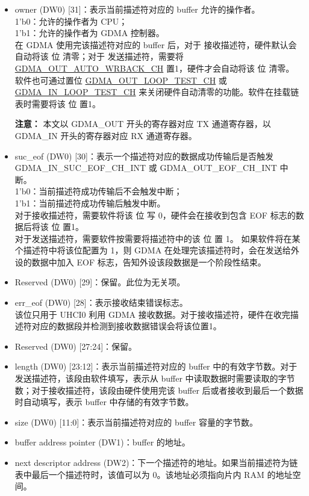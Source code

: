 \documentclass[main\_\_CN.tex]{subfiles}
\begin{document}
\begin{itemize}
    \item owner (DW0) [31]：表示当前描述符对应的 buffer 允许的操作者。\\
    1'b0：允许的操作者为 CPU；\\
    1'b1：允许的操作者为 GDMA 控制器。\\
    在 GDMA 使用完该描述符对应的 buffer 后，对于 接收描述符，硬件默认会自动将该 位 清零；对于 发送描述符，需要将 \hyperref[fielddesc:GDMAOUTAUTOWRBACKCHN]{GDMA\_OUT\_AUTO\_WRBACK\_CH} 置1，硬件才会自动将该 位 清零。 软件也可通过置位 \hyperref[fielddesc:GDMAOUTLOOPTESTCHN]{GDMA\_OUT\_LOOP\_TEST\_CH} 或 \hyperref[fielddesc:GDMAINLOOPTESTCHN]{GDMA\_IN\_LOOP\_TEST\_CH} 来关闭硬件自动清零的功能。软件在挂载链表时需要将该 位 置1。
    
    {\bfseries 注意： }本文以 GDMA\_OUT 开头的寄存器对应 TX 通道寄存器，以 GDMA\_IN 开头的寄存器对应 RX 通道寄存器。
    \item suc\_eof (DW0) [30]：表示一个描述符对应的数据成功传输后是否触发 GDMA\_IN\_SUC\_EOF\_CH\_INT 或 GDMA\_OUT\_EOF\_CH\_INT 中断。\\
    1'b0：当前描述符成功传输后不会触发中断；\\
    1'b1：当前描述符成功传输后触发中断。\\
    对于接收描述符，需要软件将该 位 写 0，硬件会在接收到包含 EOF 标志的数据后将该 位 置1。\\对于发送描述符，需要软件按需要将描述符中的该 位 置 1。
    如果软件将在某个描述符中将该位配置为 1，则 GDMA 在处理完该描述符时，会在发送给外设的数据中加入 EOF 标志，告知外设该段数据是一个阶段性结束。
    \item Reserved (DW0) [29]：保留。此位为无关项。
    \item err\_eof (DW0) [28]：表示接收结束错误标志。\\
    该位只用于 UHCI0 利用 GDMA 接收数据。对于接收描述符，硬件在收完描述符对应的数据段并检测到接收数据错误会将该位置1。
    \item Reserved (DW0) [27:24]：保留。
    \item length (DW0) [23:12]：表示当前描述符对应的 buffer 中的有效字节数。对于发送描述符，该段由软件填写，表示从 buffer 中读取数据时需要读取的字节数；对于接收描述符，该段由硬件使用完该 buffer 后或者接收到最后一个数据时自动填写，表示 buffer 中存储的有效字节数。
    \item size (DW0) [11:0]：表示当前描述符对应的 buffer 容量的字节数。
    \item buffer address pointer (DW1)：buffer 的地址。
    \item next descriptor address (DW2)：下一个描述符的地址。如果当前描述符为链表中最后一个描述符时，该值可以为 0。该地址必须指向片内 RAM 的地址空间。
\end{itemize}
\end{document}
